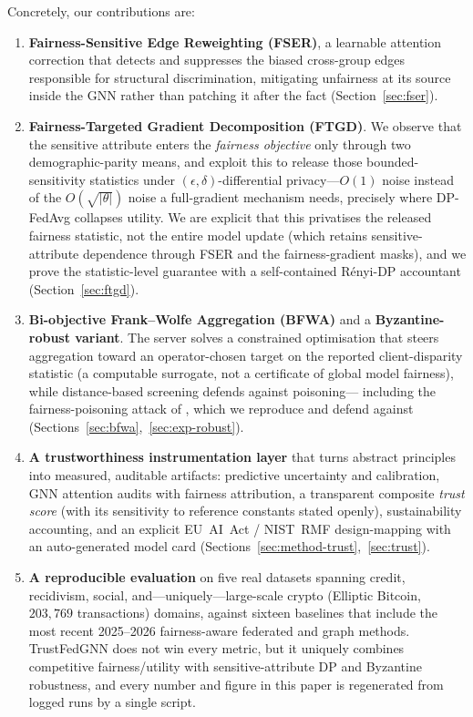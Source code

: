 \documentclass[pdflatex,sn-mathphys-num]{sn-jnl}
\theoremstyle{thmstyleone}%
\theoremstyle{thmstyletwo}%
\theoremstyle{thmstylethree}%
\begin{document}
\medskip
\noindent Concretely, our contributions are:
\begin{enumerate}
\item \textbf{Fairness-Sensitive Edge Reweighting (FSER)}, a learnable attention
correction that detects and suppresses the biased cross-group edges responsible
for structural discrimination, mitigating unfairness at its source inside the
GNN rather than patching it after the fact (Section~\ref{sec:fser}).

\item \textbf{Fairness-Targeted Gradient Decomposition (FTGD)}. We observe that
the sensitive attribute enters the \emph{fairness objective} only through two
demographic-parity means, and exploit this to release those bounded-sensitivity
statistics under $(\epsilon,\delta)$-differential privacy---$O(1)$ noise instead
of the $O(\sqrt{|\theta|})$ noise a full-gradient mechanism needs, precisely
where DP-FedAvg collapses utility. We are explicit that this privatises the
released fairness statistic, not the entire model update (which retains
sensitive-attribute dependence through FSER and the fairness-gradient masks),
and we prove the statistic-level guarantee with a self-contained R\'enyi-DP
accountant (Section~\ref{sec:ftgd}).

\item \textbf{Bi-objective Frank--Wolfe Aggregation (BFWA)} and a
\textbf{Byzantine-robust variant}. The server solves a constrained optimisation
that steers aggregation toward an operator-chosen target on the reported
client-disparity statistic (a computable surrogate, not a certificate of global
model fairness), while distance-based screening defends against poisoning---
including the fairness-poisoning attack of \cite{kasyap2025attack}, which we
reproduce and defend against (Sections~\ref{sec:bfwa},~\ref{sec:exp-robust}).

\item \textbf{A trustworthiness instrumentation layer} that turns abstract
principles into measured, auditable artifacts: predictive uncertainty and
calibration, GNN attention audits with fairness attribution, a transparent
composite \emph{trust score} (with its sensitivity to reference constants stated
openly), sustainability accounting, and an explicit EU~AI~Act / NIST~RMF
design-mapping with an auto-generated model card
(Sections~\ref{sec:method-trust},~\ref{sec:trust}).

\item \textbf{A reproducible evaluation} on five real datasets spanning credit,
recidivism, social, and---uniquely---large-scale crypto (Elliptic Bitcoin,
$203{,}769$ transactions) domains, against sixteen baselines that include the
most recent 2025--2026 fairness-aware federated and graph methods. TrustFedGNN
does not win every metric, but it uniquely combines competitive fairness/utility
with sensitive-attribute DP and Byzantine robustness,
and every number and figure in this paper is regenerated from logged runs by a
single script.
\end{enumerate}
\end{document}
